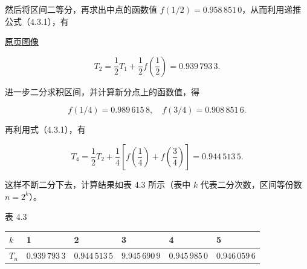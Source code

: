 \documentclass[
  10pt,
  fontset=fandol]{ctexart}
\newcounter{none} %
\begin{document}
然后将区间二等分，再求出中点的函数值 \(f(1/2)=0.958\,851\,0\)，从而利用递推公式（4.3.1），有

\href{../../source-images/pdf-102.jpeg}{原页图像}

\[
T_2=\frac12T_1+\frac12f\left(\frac12\right)=0.939\,793\,3.
\]

进一步二分求积区间，并计算新分点上的函数值，得

\[
f(1/4)=0.989\,615\,8,\quad f(3/4)=0.908\,851\,6.
\]

再利用式（4.3.1），有

\[
T_4=\frac12T_2+\frac14\left[f\left(\frac14\right)+f\left(\frac34\right)\right]=0.944\,513\,5.
\]

这样不断二分下去，计算结果如表 4.3 所示（表中 \(k\) 代表二分次数，区间等份数 \(n=2^k\)）。

表 4.3

{\def\LTcaptype{none} %
\begin{longtable}[]{@{}
  >{\raggedright\arraybackslash}p{}
  >{\raggedright\arraybackslash}p{}
  >{\raggedright\arraybackslash}p{}
  >{\raggedright\arraybackslash}p{}
  >{\raggedright\arraybackslash}p{}
  >{\raggedright\arraybackslash}p{}@{}}
\toprule\noalign{}
\begin{minipage}[b]{\linewidth}\raggedright
\(k\)
\end{minipage} & \begin{minipage}[b]{\linewidth}\raggedright
1
\end{minipage} & \begin{minipage}[b]{\linewidth}\raggedright
2
\end{minipage} & \begin{minipage}[b]{\linewidth}\raggedright
3
\end{minipage} & \begin{minipage}[b]{\linewidth}\raggedright
4
\end{minipage} & \begin{minipage}[b]{\linewidth}\raggedright
5
\end{minipage} \\
\midrule\noalign{}
\endhead
\bottomrule\noalign{}
\endlastfoot
\(T_n\) & \(0.939\,793\,3\) & \(0.944\,513\,5\) & \(9.945\,690\,9\) & \(0.945\,985\,0\) & \(0.946\,059\,6\) \\
\end{longtable}
}
\end{document}
